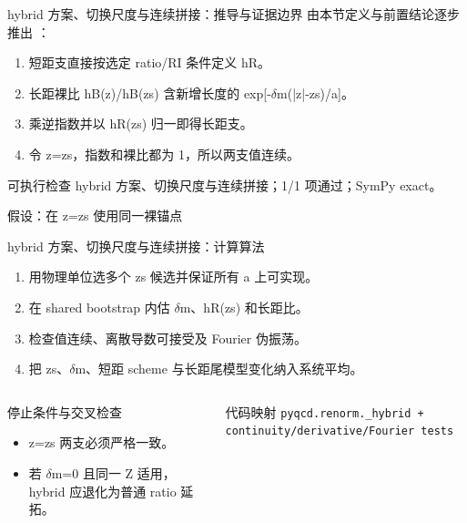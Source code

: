 \begin{frame}[t]{hybrid 方案、切换尺度与连续拼接：推导与证据边界}
\footnotesize
{}\quad 由本节定义与前置结论逐步推出 ：
\begin{enumerate}
\item 短距支直接按选定 ratio/\allowbreak{}RI 条件定义 hR。
\item 长距裸比 hB(z)/\allowbreak{}hB(zs) 含新增长度的 exp[-\ensuremath{\delta}m(|z|-zs)/\allowbreak{}a]。
\item 乘逆指数并以 hR(zs) 归一即得长距支。
\item 令 z=zs，指数和裸比都为 1，所以两支值连续。
\end{enumerate}\begin{block}{可执行检查}
\quad hybrid 方案、切换尺度与连续拼接；1/1 项通过；SymPy exact。
\par\scriptsize 假设：在 z=zs 使用同一裸锚点
\end{block}
\end{frame}

\begin{frame}[t]{hybrid 方案、切换尺度与连续拼接：计算算法}
\footnotesize
{}\begin{enumerate}
\item 用物理单位选多个 zs 候选并保证所有 a 上可实现。
\item 在 shared bootstrap 内估 \ensuremath{\delta}m、hR(zs) 和长距比。
\item 检查值连续、离散导数可接受及 Fourier 伪振荡。
\item 把 zs、\ensuremath{\delta}m、短距 scheme 与长距尾模型变化纳入系统平均。
\end{enumerate}\begin{columns}[T,onlytextwidth]
\begin{block}{停止条件与交叉检查}\scriptsize\begin{itemize}
\item[\CheckMark] z=zs 两支必须严格一致。
\item[\CheckMark] 若 \ensuremath{\delta}m=0 且同一 Z 适用，hybrid 应退化为普通 ratio 延拓。
\end{itemize}\end{block}
\begin{block}{代码映射}
\scriptsize \texttt{pyqcd.\allowbreak{}renorm.\allowbreak{}\_\allowbreak{}hybrid + continuity/\allowbreak{}derivative/\allowbreak{}Fourier tests}
\end{block}\end{columns}\end{frame}

